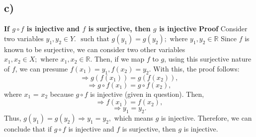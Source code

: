 \documentclass{article}
\begin{document}
\subsection{c)}
\textbf{ If $g \circ f$ is injective and $f$ is surjective, then $g$ is injective}
\newline
\newline
\textbf{Proof }
Consider two variables $y_1, y_2 \in  Y.$  $\text{ such that } g(y_1) = g(y_2); \text{ where } y_1, y_2 \in \mathbb{R}$
\newline
\newline
Since $f$ is known to be surjective, we can consider two other variables $x_1, x_2 \in X; \text{ where } x_1, x_2 \in \mathbb{R}.$
\newline
\newline
Then, if we map $f$ to $g$, using this surjective nature of $f$, we can presume $f(x_1) = y_1, f(x_2) = y_2.$ With this, the proof follows:
$$\Rightarrow g(f(x_1)) = g(f(x_2)),$$
$$\Rightarrow g \circ f(x_1) = g \circ f(x_2),$$
where $x_1$ = $x_2$ because $g \circ f$ is injective (given in question).
\newline
Then,
$$\Rightarrow f(x_1) = f(x_2),$$
$$\Rightarrow y_1 = y_2.$$
Thus, $g(y_1) = g(y_2) \Rightarrow y_1 = y_2,$ which means $g$ is injective. 
\newline
\newline
Therefore, we can conclude that if $g \circ f$ is injective and $f$ is surjective, then $g$ is injective.
\end{document}
